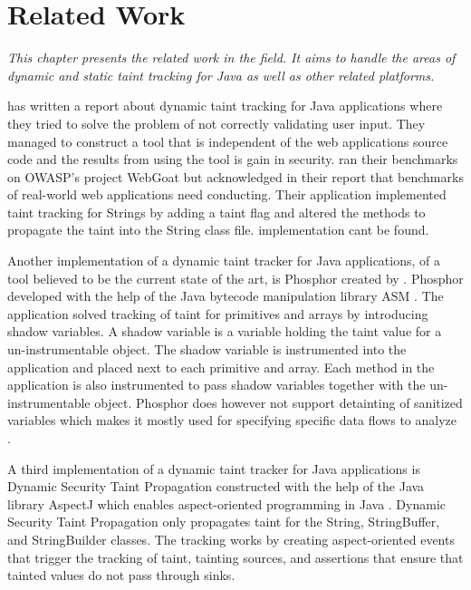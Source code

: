 \chapter{Related Work}
\label{RW}
\textit{This chapter presents the related work in the field. It aims to handle the areas of dynamic and static taint tracking for Java as well as other related platforms.}

\textcite{Haldar} has written a report about dynamic taint tracking for Java applications where they tried to solve the problem of not correctly validating user input. They managed to construct a tool that is independent of the web applications source code and the results from using the tool is gain in security. \textcite{Haldar} ran their benchmarks on OWASP’s project WebGoat \parencite{webgoat} but acknowledged in their report that benchmarks of real-world web applications need conducting. Their application implemented taint tracking for Strings by adding a taint flag and altered the methods to propagate the taint into the String class file. \textcite{Haldar} implementation cant be found.

Another implementation of a dynamic taint tracker for Java applications, of a tool believed to be the current state of the art, is Phosphor \parencite{phosphor} created by \textcite{BellJ.2014PIdd}. Phosphor developed with the help of the Java bytecode manipulation library ASM \parencite{asm}. The application solved tracking of taint for primitives and arrays by introducing shadow variables. A shadow variable is a variable holding the taint value for a un-instrumentable object. The shadow variable is instrumented into the application and placed next to each primitive and array. Each method in the application is also instrumented to pass shadow variables together with the un-instrumentable object. Phosphor does however not support detainting of sanitized variables which makes it mostly used for specifying specific data flows to analyze \parencite{BellJ.2014PIdd}. 

A third implementation of a dynamic taint tracker for Java applications is Dynamic Security Taint Propagation \parencite{securityTaint} constructed with the help of the Java library AspectJ which enables aspect-oriented programming in Java \parencite{aspectj}. Dynamic Security Taint Propagation only propagates taint for the String, StringBuffer, and StringBuilder classes. The tracking works by creating aspect-oriented events that trigger the tracking of taint, tainting sources, and assertions that ensure that tainted values do not pass through sinks.

